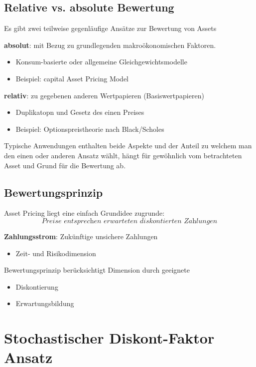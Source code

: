 \documentclass[12pt]{extreport} %
\theoremstyle{named}
\theoremstyle{nnamed}
\theoremstyle{itshape}
\theoremstyle{normal}
\begin{document}
\section{Relative vs. absolute Bewertung}
Es gibt zwei teilweise gegenläufige Ansätze zur Bewertung von Assets
\begin{description}
	\item \textbf{absolut}: mit Bezug zu grundlegenden makroökonomischen Faktoren.
		\begin{itemize}
			\item Konsum-basierte oder allgemeine Gleichgewichtsmodelle
			\item Beispiel: capital Asset Pricing Model
		\end{itemize}
	\item \textbf{relativ}: zu gegebenen anderen Wertpapieren (Basiswertpapieren)
		\begin{itemize}
			\item Duplikatopn und Gesetz des einen Preises
			\item Beispiel: Optionspreistheorie nach Black/Scholes
		\end{itemize}
\end{description}
Typische Anwendungen enthalten beide Aspekte und der Anteil zu welchem man den einen oder anderen Ansatz  wählt, hängt für gewöhnlich vom betrachteten Asset und Grund für die Bewertung ab.

\section{Bewertungsprinzip}
Asset Pricing liegt eine einfach Grundidee zugrunde:
$$ \textit{Preise entsprechen erwarteten diskontierten Zahlungen} $$ \smallskip

\textbf{Zahlungsstrom}: Zukünftige unsichere Zahlungen 
\begin{itemize}
	\item Zeit- und Risikodimension
\end{itemize}
Bewertungsprinzip berücksichtigt Dimension durch geeignete
\begin{itemize}
	\item Diskontierung
	\item Erwartungsbildung
\end{itemize}

\chapter{Stochastischer Diskont-Faktor Ansatz}
\end{document}
